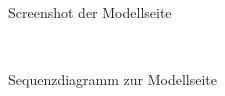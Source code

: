 \begin{figure}[!htb]
    \centering
    \begin{minipage}[t]{0.8\textwidth}
        \caption{Screenshot der Modellseite}
        \\
        \label{fig:screenshot_model}
    \end{minipage}
\end{figure}

\begin{figure}[!htb]
    \centering
    \begin{minipage}[t]{0.65\textwidth}
        \caption{Sequenzdiagramm zur Modellseite}
        \\
        \label{fig:sequence_model}
    \end{minipage}
\end{figure}

